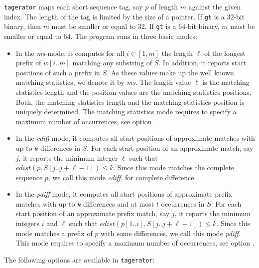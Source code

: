 \documentclass[12pt]{article}
\newcommand{\Substring}[3]{#1[#2..#3]}
\newcommand{\Program}[0]{\texttt{tagerator}\xspace}
\begin{document}
\Program maps each short sequence tag, say \(p\) of length \(m\)
against the given index. The length of the tag is limited by the
size of a pointer. If \texttt{gt} is a 32-bit binary, then \(m\) must be
smaller or equal to 32. If \texttt{gt} is a 64-bit binary, \(m\) must be 
smaller or equal to 64. The program runs in three basic modes:
\begin{itemize}
\item
In the \textit{ms}-mode, it computes for all \(i\in[1,m]\) the length \(\ell\) 
of the longest prefix of \(\Substring{w}{i}{m}\) matching any substring of 
\(S\).
In addition, it reports start positions of such a prefix in \(S\).
As these values make up the well known matching statistics, we denote 
it by \textit{ms}. The length value \(\ell\) is the matching statistics length
and the position values are the matching statistics positions.
Both, the matching statistics length and the matching statistics position
is uniquely determined. The matching statistics mode requires to specify 
a maximum number of occurrences, see option .
\item
In the \textit{cdiff}-mode, it computes all start positions of approximate 
matches with up to \(k\) differences in \(S\). For each start position of 
an approximate match, say \(j\), it reports the minimum integer \(\ell\) such 
that \(edist(p,\Substring{S}{j}{j+\ell-1})\leq k\). Since this mode matches
the complete sequence \(p\), we call this mode \textit{cdiff},
for complete difference.
\item
In the \textit{pdiff}-mode, it computes all start positions of approximate 
prefix matches with up to \(k\) differences and at most \(t\) occurrences in 
\(S\). For each start position of an approximate prefix match, say \(j\), it 
reports the minimum integers \(i\) and \(\ell\) such that 
\(edist(\Substring{p}{1}{i},\Substring{S}{j}{j+\ell-1})\leq k\). Since this 
mode matches a prefix of \(p\) with some differences, we call this mode 
\textit{pdiff}.  This mode requires to specify a maximum number of 
occurrences, see option .
\end{itemize}

The following options are available in \Program:
\end{document}

